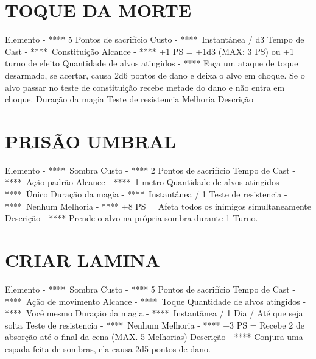 \documentclass{article}%
\begin{document}
\section{TOQUE DA MORTE}%
\label{sec:TOQUEDAMORTE}%
Elemento {-} **** 5 Pontos de sacrifício\newline%
Custo {-} ****~Instantânea / d3\newline%
Tempo de Cast {-} ****~Constituição\newline%
Alcance {-} **** +1 PS = +1d3 (MAX: 3 PS) ou +1 turno de efeito\newline%
Quantidade de alvos atingidos {-} **** Faça um ataque de toque desarmado, se acertar, causa 2d6 pontos de dano e deixa o alvo em choque. Se o alvo passar no teste de constituição recebe metade do dano e não entra em choque.\newline%
Duração da magia \newline%
Teste de resistencia \newline%
Melhoria \newline%
Descrição \newline%

%
\section{PRISÃO UMBRAL}%
\label{sec:PRISOUMBRAL}%
Elemento {-} ****~Sombra\newline%
Custo {-} **** 2 Pontos de sacrifício\newline%
Tempo de Cast {-} ****~Ação padrão\newline%
Alcance {-} ****~1 metro\newline%
Quantidade de alvos atingidos {-} ****~Único\newline%
Duração da magia {-} ****~Instantânea / 1\newline%
Teste de resistencia {-} ****~Nenhum\newline%
Melhoria {-} **** +8 PS = Afeta todos os inimigos simultaneamente\newline%
Descrição {-} **** Prende o alvo na própria sombra durante 1 Turno.\newline%

%
\section{CRIAR LAMINA}%
\label{sec:CRIARLAMINA}%
Elemento {-} ****~Sombra\newline%
Custo {-} **** 5 Pontos de sacrifício\newline%
Tempo de Cast {-} ****~Ação de movimento\newline%
Alcance {-} ****~Toque\newline%
Quantidade de alvos atingidos {-} ****~Você mesmo\newline%
Duração da magia {-} ****~Instantânea / 1 Dia / Até que seja solta\newline%
Teste de resistencia {-} ****~Nenhum\newline%
Melhoria {-} **** +3 PS = Recebe 2 de absorção até o final da cena (MAX. 5 Melhorias)\newline%
Descrição {-} **** Conjura uma espada feita de sombras, ela causa 2d5 pontos de dano.\newline%
\end{document}
